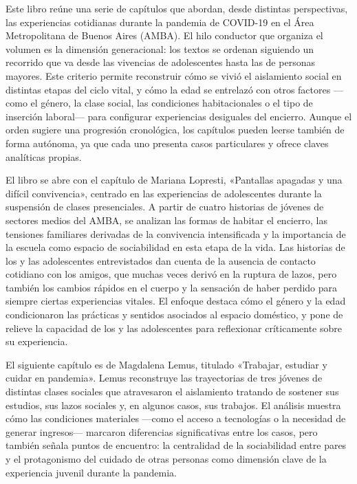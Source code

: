 Este libro reúne una serie de capítulos que abordan, desde distintas perspectivas, las experiencias cotidianas durante la pandemia de COVID-19 en el Área Metropolitana de Buenos Aires (AMBA). El hilo conductor que organiza el volumen es la dimensión generacional: los textos se ordenan siguiendo un recorrido que va desde las vivencias de adolescentes hasta las de personas mayores. Este criterio permite reconstruir cómo se vivió el aislamiento social en distintas etapas del ciclo vital, y cómo la edad se entrelazó con otros factores ---como el género, la clase social, las condiciones habitacionales o el tipo de inserción laboral--- para configurar experiencias desiguales del encierro. Aunque el orden sugiere una progresión cronológica, los capítulos pueden leerse también de forma autónoma, ya que cada uno presenta casos particulares y ofrece claves analíticas propias.

El libro se abre con el capítulo de Mariana Lopresti, «Pantallas apagadas y una difícil convivencia», centrado en las experiencias de adolescentes durante la suspensión de clases presenciales. A partir de cuatro historias de jóvenes de sectores medios del AMBA, se analizan las formas de habitar el encierro, las tensiones familiares derivadas de la convivencia intensificada y la importancia de la escuela como espacio de sociabilidad en esta etapa de la vida. Las historias de los y las adolescentes entrevistados dan cuenta de la ausencia de contacto cotidiano con los amigos, que muchas veces derivó en la ruptura de lazos, pero también los cambios rápidos en el cuerpo y la sensación de haber perdido para siempre ciertas experiencias vitales. El enfoque destaca cómo el género y la edad condicionaron las prácticas y sentidos asociados al espacio doméstico, y pone de relieve la capacidad de los y las adolescentes para reflexionar críticamente sobre su experiencia.

El siguiente capítulo es de Magdalena Lemus, titulado «Trabajar, estudiar y cuidar en pandemia». Lemus reconstruye las trayectorias de tres jóvenes de distintas clases sociales que atravesaron el aislamiento tratando de sostener sus estudios, sus lazos sociales y, en algunos casos, sus trabajos. El análisis muestra cómo las condiciones materiales ---como el acceso a tecnologías o la necesidad de generar ingresos--- marcaron diferencias significativas entre los casos, pero también señala puntos de encuentro: la centralidad de la sociabilidad entre pares y el protagonismo del cuidado de otras personas como dimensión clave de la experiencia juvenil durante la pandemia.


